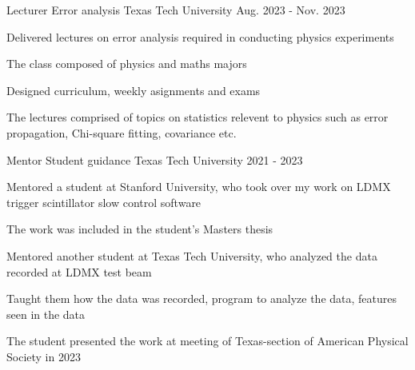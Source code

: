 

\begin{cventries}

  \cventry
    {Lecturer} %
    {Error analysis} %
    {Texas Tech University} %
    {Aug. 2023 - Nov. 2023} %
    {
      \begin{cvitems} %
      \item {Delivered lectures on error analysis required in conducting physics experiments}
      \item {The class composed of physics and maths majors}
      \item {Designed curriculum, weekly asignments and exams}
      \item {The lectures comprised of topics on statistics relevent to physics such as error propagation, Chi-square fitting, covariance etc.}
      \end{cvitems}
    }

  \cventry
    {Mentor} %
    {Student guidance} %
    {Texas Tech University} %
    {2021 - 2023} %
    {
      \begin{cvitems} %
      \item {Mentored a student at Stanford University, who took over my work on LDMX trigger scintillator slow control software}
      \item {The work was included in the student's Masters thesis}
      \item {Mentored another student at Texas Tech University, who analyzed the data recorded at LDMX test beam}
      \item {Taught them how the data was recorded, program to analyze the data, features seen in the data}
      \item {The student presented the work at meeting of Texas-section of American Physical Society in 2023}
      \end{cvitems}
    }


\end{cventries}
